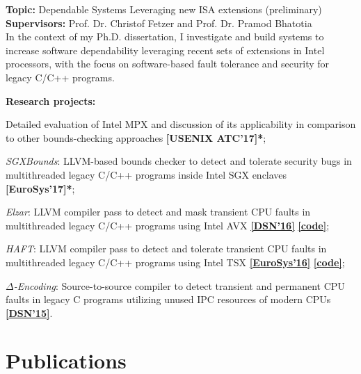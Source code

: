 \documentclass[letterpaper]{article}
\renewenvironment{itemize}{
  \begin{list}{}{
    \setlength{\leftmargin}{1.5em}
  }
}{
  \end{list}
}
\begin{document}
\begin{itemize}
\item {\bf Topic:} Dependable Systems Leveraging new ISA extensions (preliminary)\\
{\bf Supervisors:} Prof. Dr. Christof Fetzer and Prof. Dr. Pramod Bhatotia\vspace{-13pt}\\

In the context of my Ph.D. dissertation, I investigate and build systems to increase software dependability leveraging recent sets of extensions in Intel processors, with the focus on software-based fault tolerance and security for legacy C/C++ programs. %

{\bf Research projects:}
	\begin{itemize}%
		\item Detailed evaluation of Intel MPX and discussion of its applicability in comparison to other bounds-checking approaches {\bf [USENIX ATC'17]*};
		\item \emph{SGXBounds}: LLVM-based bounds checker to detect and tolerate security bugs in multithreaded legacy C/C++ programs inside Intel SGX enclaves {\bf [EuroSys'17]*};
		\item \emph{Elzar}: LLVM compiler pass to detect and mask transient CPU faults in multithreaded legacy C/C++ programs using Intel AVX \href{http://se.inf.tu-dresden.de/pubs/papers/Kuvaiskii2016elzar.pdf}{{\bf [DSN'16]}} \href{https://github.com/tudinfse/elzar}{{\bf [code]}};
		\item \emph{HAFT}: LLVM compiler pass to detect and tolerate transient CPU faults in multithreaded legacy C/C++ programs using Intel TSX \href{http://se.inf.tu-dresden.de/pubs/papers/Kuvaiskii2016HAFT.pdf}{{\bf [EuroSys'16]}} \href{https://github.com/tudinfse/haft}{{\bf [code]}};
		\item \emph{$\Delta$-Encoding}: Source-to-source compiler to detect transient and permanent CPU faults in legacy C programs utilizing unused IPC resources of modern CPUs \href{http://se.inf.tu-dresden.de/pubs/papers/DELTAENC.pdf}{{\bf [DSN'15]}}.
	\end{itemize}%
\end{itemize}%


\section*{Publications}
\end{document}
